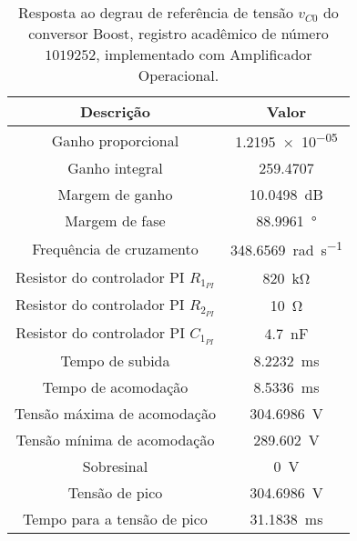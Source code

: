 \begin{table}[!ht]
\centering
\caption{Resposta ao degrau de referência de tensão $v_{C0}$ do conversor Boost, registro acadêmico de número $1019252$, implementado com Amplificador Operacional.}
\label{tab:resposta1malhaAmpOp}
\begin{tabular}{@{}cc@{}}
\toprule
\textbf{Descrição} & \textbf{Valor}\\ \midrule
Ganho proporcional & \SI{1.2195e-05}{}\\
Ganho integral & \SI{259.4707}{}\\
Margem de ganho & \SI{10.0498}{\deci\bel}\\
Margem de fase & \SI{88.9961}{\degree}\\
Frequência de cruzamento & \SI{348.6569}{\radian\per\s}\\
Resistor do controlador PI $R_{1_{PI}}$ & \SI{820}{\kilo\ohm}\\
Resistor do controlador PI $R_{2_{PI}}$ & \SI{10}{\ohm}\\
Resistor do controlador PI $C_{1_{PI}}$ & \SI{4.7}{\nano\F}\\
Tempo de subida & \SI{8.2232}{\milli\s}\\
Tempo de acomodação & \SI{8.5336}{\milli\s}\\
Tensão máxima de acomodação & \SI{304.6986}{\V}\\
Tensão mínima de acomodação & \SI{289.602}{\V}\\
Sobresinal & \SI{0}{\V}\\
Tensão de pico & \SI{304.6986}{\V}\\
Tempo para a tensão de pico & \SI{31.1838}{\milli\s}\\
\bottomrule
\end{tabular}
\end{table}

